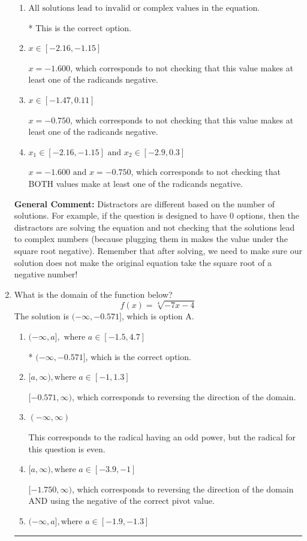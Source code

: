 \documentclass{extbook}[14pt]
\newcommand{\litem}[1]{\item #1

\rule{\textwidth}{0.4pt}}
\begin{document}
\begin{enumerate}
{\begin{enumerate}[label=\Alph*.]
$x = 1.600 \text{ and } x = 0.750$, which corresponds to getting the negatives of the values that make the equation 0.
\item \( \text{All solutions lead to invalid or complex values in the equation.} \)

* This is the correct option.
\item \( x \in [-2.16,-1.15] \)

$x = -1.600$, which corresponds to not checking that this value makes at least one of the radicands negative.
\item \( x \in [-1.47,0.11] \)

$x = -0.750$, which corresponds to not checking that this value makes at least one of the radicands negative.
\item \( x_1 \in [-2.16, -1.15] \text{ and } x_2 \in [-2.9,0.3] \)

$x = -1.600 \text{ and } x = -0.750$, which corresponds to not checking that BOTH values make at least one of the radicands negative.
\end{enumerate}

\textbf{General Comment:} Distractors are different based on the number of solutions. For example, if the question is designed to have 0 options, then the distractors are solving the equation and not checking that the solutions lead to complex numbers (because plugging them in makes the value under the square root negative). Remember that after solving, we need to make sure our solution does not make the original equation take the square root of a negative number!
}
\litem{
What is the domain of the function below?
\[ f(x) = \sqrt[4]{-7 x - 4} \]The solution is \( (-\infty, -0.571] \), which is option A.\begin{enumerate}[label=\Alph*.]
\item \( (-\infty, a], \text{ where } a \in [-1.5, 4.7] \)

* $(-\infty, -0.571]$, which is the correct option.
\item \( [a, \infty), \text{where } a \in [-1, 1.3] \)

 $[-0.571, \infty)$, which corresponds to reversing the direction of the domain.
\item \( (-\infty, \infty) \)

This corresponds to the radical having an odd power, but the radical for this question is even.
\item \( [a, \infty), \text{where } a \in [-3.9, -1] \)

$[-1.750, \infty)$, which corresponds to reversing the direction of the domain AND using the negative of the correct pivot value.
\item \( (-\infty, a], \text{where } a \in [-1.9, -1.3] \)


\end{enumerate}}
\end{enumerate}
\end{document}
